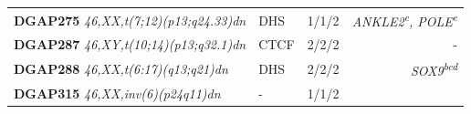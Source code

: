 \documentclass[a4paper,twoside=true,openright,parskip=full,chapterprefix=true,11pt,headings=normal,bibliography=totoc,listof=totoc,titlepage=on,captions=tableabove,draft=false]{scrreprt}
\theoremstyle{definition}
\theoremstyle{definition}
\theoremstyle{definition}
\theoremstyle{remark}
\begin{document}
\begin{longtable}[]{@{}lllr@{}}
\begin{minipage}[t]{0.25\columnwidth}
\textbf{DGAP275} \emph{46,XX,t(7;12)(p13;q24.33)dn}\strut
\end{minipage} & \begin{minipage}[t]{0.19\columnwidth}\raggedright
DHS\strut
\end{minipage} & \begin{minipage}[t]{0.26\columnwidth}\raggedright
1/1/2\strut
\end{minipage} & \begin{minipage}[t]{0.18\columnwidth}\raggedleft
\emph{ANKLE2\textsuperscript{e}, POLE\textsuperscript{e}}\strut
\end{minipage}\tabularnewline
\begin{minipage}[t]{0.25\columnwidth}\raggedright
\textbf{DGAP287} \emph{46,XY,t(10;14)(p13;q32.1)dn}\strut
\end{minipage} & \begin{minipage}[t]{0.19\columnwidth}\raggedright
CTCF\strut
\end{minipage} & \begin{minipage}[t]{0.26\columnwidth}\raggedright
2/2/2\strut
\end{minipage} & \begin{minipage}[t]{0.18\columnwidth}\raggedleft
-\strut
\end{minipage}\tabularnewline
\begin{minipage}[t]{0.25\columnwidth}\raggedright
\textbf{DGAP288} \emph{46,XX,t(6:17)(q13;q21)dn}\strut
\end{minipage} & \begin{minipage}[t]{0.19\columnwidth}\raggedright
DHS\strut
\end{minipage} & \begin{minipage}[t]{0.26\columnwidth}\raggedright
2/2/2\strut
\end{minipage} & \begin{minipage}[t]{0.18\columnwidth}\raggedleft
\emph{SOX9\textsuperscript{bcd}}\strut
\end{minipage}\tabularnewline
\begin{minipage}[t]{0.25\columnwidth}\raggedright
\textbf{DGAP315} \emph{46,XX,inv(6)(p24q11)dn}\strut
\end{minipage} & \begin{minipage}[t]{0.19\columnwidth}\raggedright
-\strut
\end{minipage} & \begin{minipage}[t]{0.26\columnwidth}\raggedright
1/1/2\strut
\end{minipage} & \begin{minipage}[t]{0.18\columnwidth}\raggedleft

\end{minipage}
\end{longtable}
\end{document}
